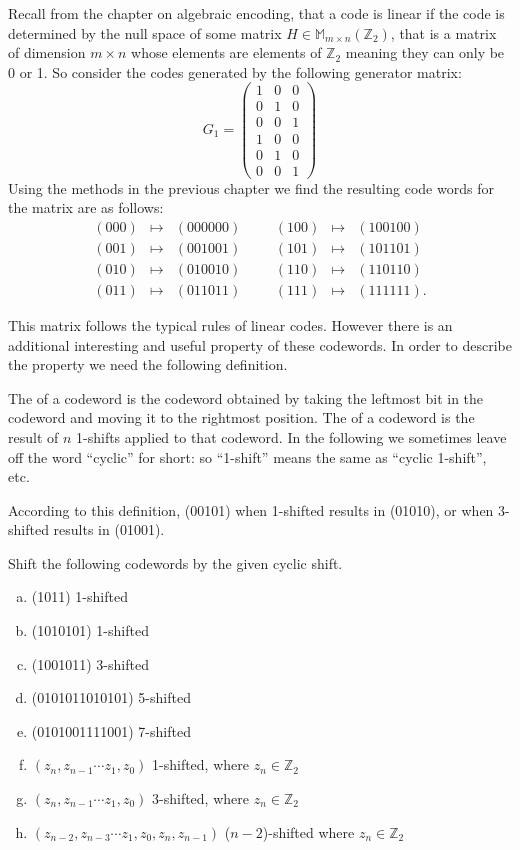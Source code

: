   Recall from the chapter on algebraic encoding, that a code is linear if the code is determined by the null space of some matrix $H \in \mathbb{M}_{m\times n}(\mathbb{Z}_2)$, that is a matrix of dimension $m \times n$ whose elements are elements of $\mathbb{Z}_2$ meaning they can only be 0 or 1.  So consider the codes generated by the following generator matrix:
\[
G_1 
= 
\begin{pmatrix}
1 & 0 & 0 \\
0 & 1 & 0 \\
0 & 0 & 1 \\
1 & 0 & 0 \\
0 & 1 & 0 \\
0 & 0 & 1 
\end{pmatrix}
\]
Using the methods in the previous chapter we find the resulting code words for the matrix are as follows:
\[
\begin{array}{rclccrcl}
(000) & \mapsto & (000000) & & & (100) & \mapsto & (100100) \\
(001) & \mapsto & (001001) & & & (101) & \mapsto & (101101) \\
(010) & \mapsto & (010010) & & & (110) & \mapsto & (110110) \\
(011) & \mapsto & (011011) & & & (111) & \mapsto & (111111).
\end{array}
\]

This matrix follows the typical rules of linear codes. However there is an additional interesting and useful property of these codewords.  In order to describe the property we need the following definition.

\begin {defn}{}
The   of a codeword is the codeword obtained by taking the leftmost bit in the codeword and moving it to the rightmost position. The   of a codeword is the result of $n$ 1-shifts applied to that codeword. In the following we sometimes leave off the word ``cyclic'' for short: so ``1-shift'' means the same as ``cyclic 1-shift'', etc.
\end {defn}
According to this definition, (00101) when 1-shifted results in (01010), or when 3-shifted results in (01001).

\begin {exercise}{}
Shift the following codewords by the given cyclic shift.
\begin {enumerate}[a)]
\item (1011)  1-shifted
\item (1010101)  1-shifted
\item (1001011)  3-shifted
\item (0101011010101) 5-shifted
\item (0101001111001)  7-shifted
\item $(z_n, z_{n-1} \cdots z_1,z_0)$  1-shifted, where $z_n \in \mathbb{Z}_2$
\item $(z_n, z_{n-1} \cdots z_1,z_0)$  3-shifted, where $z_n \in \mathbb{Z}_2$
\item $(z_{n-2}, z_{n-3} \cdots z_1, z_0, z_{n},z_{n-1})$ ($n-2$)-shifted where $z_n \in \mathbb{Z}_2$
\end {enumerate}
\end {exercise}

